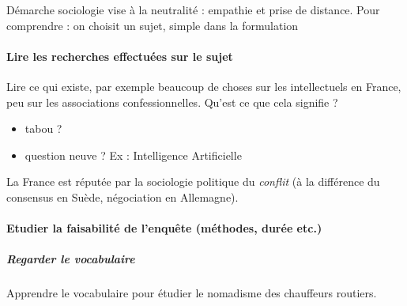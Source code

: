 \begin{Synthesis}
Démarche sociologie vise à la neutralité : empathie et prise de distance. 
Pour comprendre : on choisit un sujet, simple dans la formulation
\end{Synthesis}


\paragraph{Lire les recherches effectuées sur le sujet}

Lire ce qui existe, par exemple beaucoup de choses sur les intellectuels en France, peu sur les associations confessionnelles. Qu'est ce que cela signifie ?
\begin{itemize}
\item tabou ?
\item question neuve ? Ex : Intelligence Artificielle
\end{itemize}

\begin{Ex}
La France est réputée par la sociologie politique du \textit{conflit} (à la différence du consensus en Suède, négociation en Allemagne).
\end{Ex}


\paragraph{Etudier la faisabilité de l’enquête (méthodes, durée etc.)}
\subparagraph{Regarder le vocabulaire}

\begin{Ex}
Apprendre le vocabulaire pour étudier le nomadisme des chauffeurs routiers.
\end{Ex}

